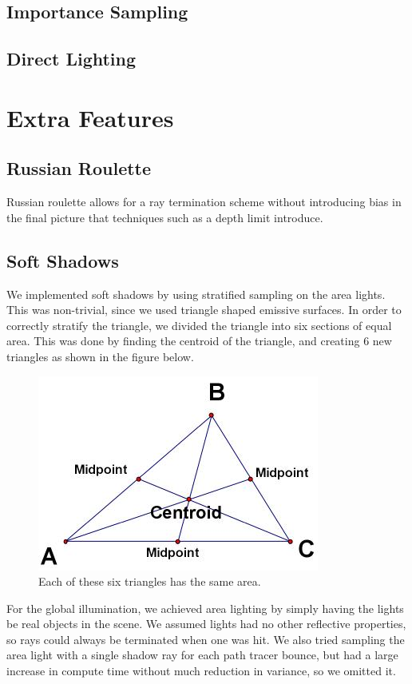 \documentclass[11pt]{article}
\begin{document}
\subsection{Importance Sampling}

\subsection{Direct Lighting}

\section{Extra Features}

\subsection{Russian Roulette}
Russian roulette allows for a ray termination scheme without introducing bias in the final picture that techniques such as a depth limit introduce.

\subsection{Soft Shadows}
We implemented soft shadows by using stratified sampling on the area lights. This was non-trivial, since we used triangle shaped emissive surfaces. In order to correctly stratify the triangle, we divided the triangle into six sections of equal area. This was done by finding the centroid of the triangle, and creating 6 new triangles as shown in the figure below.

\begin{figure}
	\begin{center}
		\includegraphics[width=.5\linewidth]{figs/centroid}
		\caption{Each of these six triangles has the same area.}
	\end{center}
\end{figure}

For the global illumination, we achieved area lighting by simply having the lights be real objects in the scene. We assumed lights had no other reflective properties, so rays could always be terminated when one was hit. We also tried sampling the area light with a single shadow ray for each path tracer bounce, but had a large increase in compute time without much reduction in variance, so we omitted it.
\end{document}
